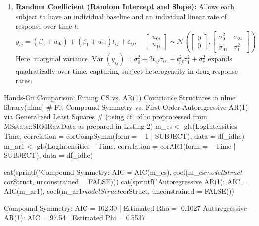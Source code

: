 \documentclass[11pt,twoside,openright]{book}
\begin{document}
\begin{enumerate}
    \item \textbf{Random Coefficient (Random Intercept and Slope):}
    Allows each subject to have an individual baseline and an individual linear rate of response over time $t$:
    \begin{equation}
    \label{eq:random_slope}
    y_{ij} = (\beta_0 + u_{0i}) + (\beta_1 + u_{1i}) t_{ij} + \varepsilon_{ij}, \quad \begin{bmatrix} u_{0i} \\ u_{1i} \end{bmatrix} \sim \mathcal{N}\left( \begin{bmatrix} 0 \\ 0 \end{bmatrix}, \begin{bmatrix} \sigma_0^2 & \sigma_{01} \\ \sigma_{01} & \sigma_1^2 \end{bmatrix} \right)
    \end{equation}
    Here, marginal variance $\operatorname{Var}(y_{ij}) = \sigma_0^2 + 2 t_{ij} \sigma_{01} + t_{ij}^2 \sigma_1^2 + \sigma_e^2$ expands quadratically over time, capturing subject heterogeneity in drug response rates.
\end{enumerate}

\begin{rchunk}{Hands-On Comparison: Fitting CS vs. AR(1) Covariance Structures in nlme}
library(nlme)
# Fit Compound Symmetry vs. First-Order Autoregressive AR(1) via Generalized Least Squares
# (using df_idhc preprocessed from MSstats::SRMRawData as prepared in Listing 2)
m_cs  <- gls(LogIntensities ~ Time, correlation = corCompSymm(form = ~ 1 | SUBJECT), data = df_idhc)
m_ar1 <- gls(LogIntensities ~ Time, correlation = corAR1(form = ~ Time | SUBJECT), data = df_idhc)

cat(sprintf("Compound Symmetry:   AIC = %
            AIC(m_cs), coef(m_cs$modelStruct$corStruct, unconstrained = FALSE)))
cat(sprintf("Autoregressive AR(1): AIC = %
            AIC(m_ar1), coef(m_ar1$modelStruct$corStruct, unconstrained = FALSE)))
\end{rchunk}

\begin{routput}
Compound Symmetry:   AIC = 102.30 | Estimated Rho = -0.1027
Autoregressive AR(1): AIC = 97.54 | Estimated Phi = 0.5537
\end{routput}
\end{document}
